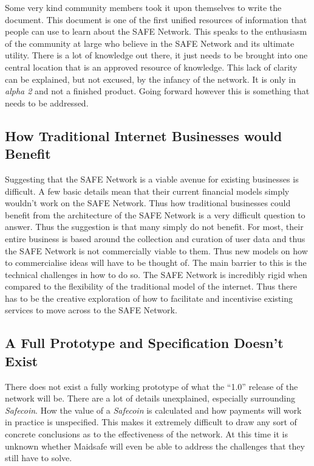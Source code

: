 Some very kind community members took it upon themselves to write the  document. This document is one of the first unified resources of information that people can use to learn about the SAFE Network. This speaks to the enthusiasm of the community at large who believe in the SAFE Network and its ultimate utility. There is a lot of knowledge out there, it just needs to be brought into one central location that is an approved resource of knowledge. This lack of clarity can be explained, but not excused, by the infancy of the network. It is only in \textit{alpha 2} and not a finished product. Going forward however this is something that needs to be addressed.

\subsection{How Traditional Internet Businesses would Benefit}

Suggesting that the SAFE Network is a viable avenue for existing businesses is difficult. A few basic details mean that their current financial models simply wouldn't work on the SAFE Network. Thus how traditional businesses could benefit from the architecture of the SAFE Network is a very difficult question to answer. Thus the suggestion is that many simply do not benefit. For most, their entire business is based around the collection and curation of user data and thus the SAFE Network is not commercially viable to them. Thus new models on how to commercialise ideas will have to be thought of. The main barrier to this is the technical challenges in how to do so. The SAFE Network is incredibly rigid when compared to the flexibility of the traditional model of the internet. Thus there has to be the creative exploration of how to facilitate and incentivise existing services to move across to the SAFE Network.

\subsection{A Full Prototype and Specification Doesn't Exist}

There does not exist a fully working prototype of what the ``1.0'' release of the network will be. There are a lot of details unexplained, especially surrounding \textit{Safecoin}. How the value of a \textit{Safecoin} is calculated and how payments will work in practice is unspecified. This makes it extremely difficult to draw any sort of concrete conclusions as to the effectiveness of the network. At this time it is unknown whether Maidsafe will even be able to address the challenges that they still have to solve.

